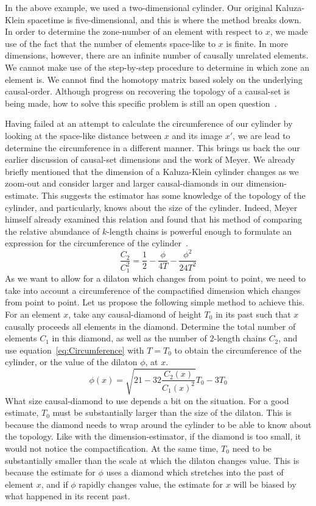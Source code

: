 \documentclass[a4paper,12pt]{article}
\numberwithin{equation}{section}
\begin{document}
In the above example, we used a two-dimensional cylinder. Our original Kaluza-Klein spacetime is five-dimensional, and this is where the method breaks down. In order to determine the zone-number of an element with respect to $x$, we made use of the fact that the number of elements space-like to $x$ is finite. In more dimensions, however, there are an infinite number of causally unrelated elements. We cannot make use of the step-by-step procedure to determine in which zone an element is. We cannot find the homotopy matrix based solely on the underlying causal-order. Although progress on recovering the topology of a causal-set is being made, how to solve this specific problem is still an open question~\cite{Major2007}.

Having failed at an attempt to calculate the circumference of our cylinder by looking at the space-like distance between $x$ and its image $x'$, we are lead to determine the circumference in a different manner. This brings us back the our earlier discussion of causal-set dimensions and the work of Meyer. We already briefly mentioned that the dimension of a Kaluza-Klein cylinder changes as we zoom-out and consider larger and larger causal-diamonds in our dimension-estimate. This suggests the estimator has some knowledge of the topology of the cylinder, and particularly, knows about the size of the cylinder. Indeed, Meyer himself already examined this relation and found that his method of comparing the relative abundance of $k$-length chains is powerful enough to formulate an expression for the circumference of the cylinder~\cite{Meyer1988}.
\begin{equation}
\label{eq:Circumference}
\frac{C_2}{C_1^2}=\frac{1}{2}-\frac{\phi}{4 T}-\frac{\phi^2}{24 T^2}
\end{equation}
As we want to allow for a dilaton which changes from point to point, we need to take into account a circumference of the compactified dimension which changes from point to point. Let us propose the following simple method to achieve this. For an element $x$, take any causal-diamond of height $T_0$ in its past such that $x$ causally proceeds all elements in the diamond. Determine the total number of elements $C_1$ in this diamond, as well as the number of $2$-length chains $C_2$, and use equation~\ref{eq:Circumference} with $T=T_0$ to obtain the circumference of the cylinder, or the value of the dilaton $\phi$, at $x$. 
\begin{equation}
\label{eq:Circumference2}
\phi(x)=\sqrt{21-32 \frac{C_2(x)}{C_1(x)^2}}T_0-3 T_0
\end{equation}
What size causal-diamond to use depends a bit on the situation. For a good estimate, $T_0$ must be substantially larger than the size of the dilaton. This is because the diamond needs to wrap around the cylinder to be able to know about the topology. Like with the dimension-estimator, if the diamond is too small, it would not notice the compactification. At the same time, $T_0$ need to be substantially smaller than the scale at which the dilaton changes value. This is because the estimate for $\phi$ uses a diamond which stretches into the past of element $x$, and if $\phi$ rapidly changes value, the estimate for $x$ will be biased by what happened in its recent past.
\end{document}
